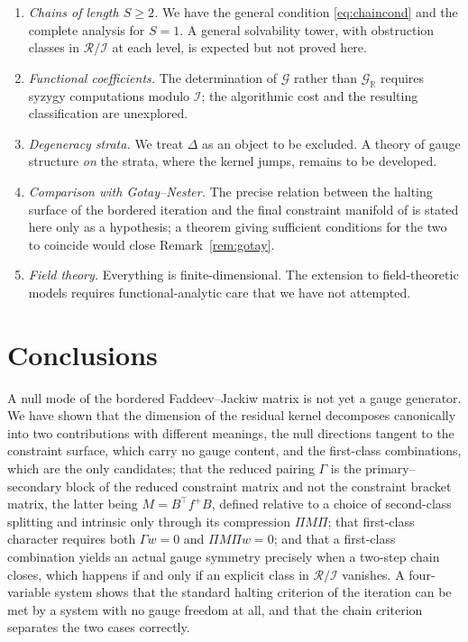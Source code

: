 \documentclass[12pt]{article}
\theoremstyle{plain}
\theoremstyle{definition}
\theoremstyle{remark}
\newcommand{\R}{\mathbb{R}}
\newcommand{\Ical}{\mathcal{I}}
\newcommand{\Rring}{\mathcal{R}}
\begin{document}
	\begin{enumerate}[label=(O\arabic*),leftmargin=2.6em,itemsep=0.35em]
		\item\label{open:chains} \emph{Chains of length $S\geq2$.} We have the
		general condition \eqref{eq:chaincond} and the complete analysis for $S=1$.
		A general solvability tower, with obstruction classes in $\Rring/\Ical$ at
		each level, is expected but not proved here.
		\item \emph{Functional coefficients.} The determination of $\mathcal{G}$
		rather than $\mathcal{G}_{\R}$ requires syzygy computations modulo $\Ical$;
		the algorithmic cost and the resulting classification are unexplored.
		\item \emph{Degeneracy strata.} We treat $\Delta$ as an object to be excluded.
		A theory of gauge structure \emph{on} the strata, where the kernel jumps,
		remains to be developed.
		\item \emph{Comparison with Gotay--Nester.} The precise relation between the
		halting surface of the bordered iteration and the final constraint manifold
		of \cite{GNH1978} is stated here only as a hypothesis; a theorem giving
		sufficient conditions for the two to coincide would close
		Remark~\ref{rem:gotay}.
		\item \emph{Field theory.} Everything is finite-dimensional. The extension to
		field-theoretic models requires functional-analytic care that we have not
		attempted.
	\end{enumerate}
	
	\section{Conclusions}
	\label{sec:conclusions}
	
	A null mode of the bordered Faddeev--Jackiw matrix is not yet a gauge generator.
	We have shown that the dimension of the residual kernel decomposes canonically
	into two contributions with different meanings, the null directions tangent to
	the constraint surface, which carry no gauge content, and the first-class
	combinations, which are the only candidates; that the reduced pairing $\Gamma$
	is the
	primary--secondary block of the reduced constraint matrix and not the constraint
	bracket matrix, the latter being $M=B^{\top}f^{+}B$, defined relative to a
	choice of second-class splitting and intrinsic only through its compression
	$\Pi M\Pi$; that first-class character requires
	both $\Gamma w=0$ and $\Pi M\Pi w=0$; and that a first-class combination yields
	an actual gauge symmetry precisely when a two-step chain closes, which happens
	if and only if an explicit class in $\Rring/\Ical$ vanishes. A four-variable
	system shows that the standard halting criterion of the iteration can be met by
	a system with no gauge freedom at all, and that the chain criterion separates
	the two cases correctly.
	
\end{document}
